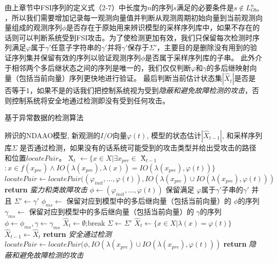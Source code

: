 由上章节中FSI序列的定义式（2-7）中长度为$n$的序列$s$满足的必要条件是$s\notin L_{Obs}^n$，所以我们需要增加记录每一观测向量值并判断从观测周期初始向量到当前观测向量组成的观测序列$\phi$是否存在于原始用来辨识模型的采样序列库中，如果不存在的话则可以判断系统受到FSI攻击。为了使检测更加有效，我们只保留每次检测时序列满足$ \varphi$属于$\gamma'$任意子字符串的$\gamma'$并将$\gamma'$保存于$\varSigma'$，主要目的是删除没有用到的验证序列集并保留有效的序列以验证观测序列$\phi$是否属于采样序列库的子串。 此外介于相邻两个多后继状态之间的序列是唯一的，我们仅仅判断$ \varphi $和$ \gamma $的多后继映射向量（包括当前向量）序列更快地进行验证。 最后判断当前估计状态集$|\hat{X}_{t}|$是否是否等于1，如果不是的话我们把控制系统视为受到\textit {隐蔽和避免故障检测的攻击}，否则控制系统将安全地通过检测即没有受到任何攻击。

\begin{algorithm}[h]
		\caption{基于异常数据的检测算法}
		\label{algo:abd}
		\begin{algorithmic}[1]
			\Require %
			辨识的NDAAO模型, 新观测的$I/O$向量$\varphi(t)$, 模型的状态估计$|\hat{X}_{t-1}|$, 和采样序列库$\varSigma$
			\Ensure %
			是否通过检测，如果没有的话系统可能受到的攻击类型并给出受攻击的路径和位置$locatePair$。
			\State \^{X}$_{t}$ $\leftarrow \{x\in X|\exists x_{pre}\in$ \^{X}$_{t-1}$$:x\in f(x_{pre}) \wedge IO(\lambda(x_{pre}),\lambda(x))=IO(\lambda(x_{pre}),\varphi(t))\}$
			\State $locatePair\leftarrow locatePair((\varphi_{init},...,\varphi(t)),IO(\lambda(x_{pre})\cup IO(\lambda(x_{pre}),\varphi(t)))$
			\State \textbf{return} \textit{蛮力和类故障攻击}
			\EndIf
			\State $\phi \leftarrow (\varphi_{init},...,\varphi(t))$
			\State 保留满足 $\varphi 属于\gamma'$子串的$\gamma'$ 并且 $\varSigma' \leftarrow \gamma'$
			\State $\phi_{ms} \leftarrow$ 保留对应到模型中的多后继向量（包括当前向量）的 $\phi$的序列
			\State $\gamma_{ms} \leftarrow$ 保留对应到模型中的多后继向量（包括当前向量）的 $\gamma$的序列
			\State $\phi\leftarrow \phi_{ms}, \gamma\leftarrow \gamma_{ms}$
			\State $\hat{X}_t \leftarrow \emptyset$;\State break
			\EndIf
			\EndFor
			$\varSigma \leftarrow \varSigma'$
			\EndIf
			\Else
			\State $\hat{X}_t \leftarrow \{x\in X|\lambda(x)=\varphi(t)\}$
			\EndIf
			$\hat{X}_{t-1}\leftarrow \hat{X}_t$
			\State \textbf{return} \textit{安全通过检测}
			\Else
			\State $locatePair\leftarrow locatePair(\phi,IO(\lambda(x_{pre})\cup
			IO(\lambda(x_{pre}),\varphi(t)))$
			\State \textbf{return} \textit{隐蔽和避免故障检测的攻击}
			\EndIf
		\end{algorithmic}
	\end{algorithm}

